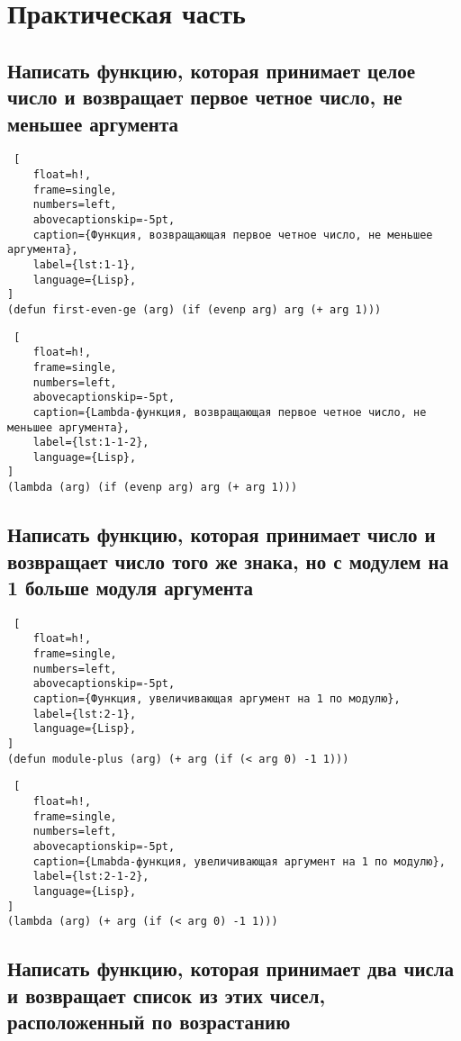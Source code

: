 \chapter{Практическая часть}

\section{Написать функцию, которая принимает целое число и возвращает первое четное число, не меньшее аргумента}

\begin{lstlisting} [
	float=h!,
	frame=single,
	numbers=left,
	abovecaptionskip=-5pt,
	caption={Функция, возвращающая первое четное число, не меньшее аргумента},
	label={lst:1-1},
	language={Lisp},
]
(defun first-even-ge (arg) (if (evenp arg) arg (+ arg 1)))
\end{lstlisting}

\begin{lstlisting} [
	float=h!,
	frame=single,
	numbers=left,
	abovecaptionskip=-5pt,
	caption={Lambda-функция, возвращающая первое четное число, не меньшее аргумента},
	label={lst:1-1-2},
	language={Lisp},
]
(lambda (arg) (if (evenp arg) arg (+ arg 1)))
\end{lstlisting}

\section{Написать функцию, которая принимает число и возвращает число того же знака, но с модулем на 1 больше модуля аргумента}

\begin{lstlisting} [
	float=h!,
	frame=single,
	numbers=left,
	abovecaptionskip=-5pt,
	caption={Функция, увеличивающая аргумент на 1 по модулю},
	label={lst:2-1},
	language={Lisp},
]
(defun module-plus (arg) (+ arg (if (< arg 0) -1 1)))
\end{lstlisting}

\begin{lstlisting} [
	float=h!,
	frame=single,
	numbers=left,
	abovecaptionskip=-5pt,
	caption={Lmabda-функция, увеличивающая аргумент на 1 по модулю},
	label={lst:2-1-2},
	language={Lisp},
]
(lambda (arg) (+ arg (if (< arg 0) -1 1)))
\end{lstlisting}

\section{Написать функцию, которая принимает два числа и возвращает список из этих чисел, расположенный по возрастанию}

